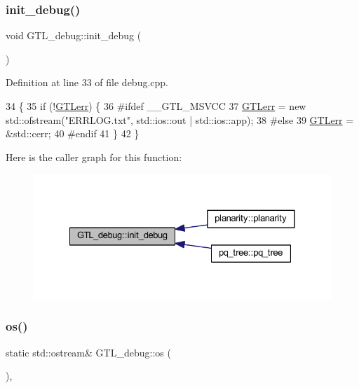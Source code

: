 \subsubsection{\texorpdfstring{init\+\_\+debug()}{init\_debug()}}
{\footnotesize\ttfamily void G\+T\+L\+\_\+debug\+::init\+\_\+debug (\begin{DoxyParamCaption}{ }\end{DoxyParamCaption})\hspace{0.3cm}{\ttfamily [static]}}



Definition at line 33 of file debug.\+cpp.


\begin{DoxyCode}
34 \{
35     \textcolor{keywordflow}{if} (!\mbox{\hyperlink{class_g_t_l__debug_a342e76e2d4f128a29548aae14172db45}{GTLerr}}) \{
36 \textcolor{preprocessor}{#ifdef \_\_GTL\_MSVCC}
37         \mbox{\hyperlink{class_g_t_l__debug_a342e76e2d4f128a29548aae14172db45}{GTLerr}} = \textcolor{keyword}{new} std::ofstream(\textcolor{stringliteral}{"ERRLOG.txt"}, std::ios::out | std::ios::app);
38 \textcolor{preprocessor}{#else}
39     \mbox{\hyperlink{class_g_t_l__debug_a342e76e2d4f128a29548aae14172db45}{GTLerr}} = &std::cerr;
40 \textcolor{preprocessor}{#endif}
41     \}
42 \}
\end{DoxyCode}
Here is the caller graph for this function\+:\nopagebreak
\begin{figure}[H]
\begin{center}
\leavevmode
\includegraphics[width=328pt]{class_g_t_l__debug_a119223c9000c1639d79d1a14a447c67a_icgraph}
\end{center}
\end{figure}
\mbox{\label{class_g_t_l__debug_a40282dee89c7cd8ea6bd02856e6cd73f}} 
\subsubsection{\texorpdfstring{os()}{os()}}
{\footnotesize\ttfamily static std\+::ostream\& G\+T\+L\+\_\+debug\+::os (\begin{DoxyParamCaption}{ }\end{DoxyParamCaption})\hspace{0.3cm}{\ttfamily [inline]}, {\ttfamily [static]}}




